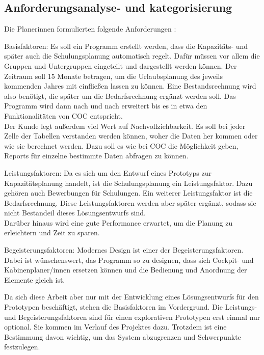 \documentclass [12pt, a4paper, oneside, titlepage, ngerman]{article}
\begin{document}
\subsection{Anforderungsanalyse- und kategorisierung}
Die Planerinnen formulierten folgende Anforderungen \cite[vgl.]{Gespraech2}:
\begin{description}
\item Basisfaktoren: Es soll ein Programm erstellt werden, dass die Kapazitäts- und später auch die Schulungsplanung automatisch regelt. Dafür müssen vor allem die Gruppen und Untergruppen eingeteilt und dargestellt werden können. Der Zeitraum soll 15 Monate betragen, um die Urlaubsplanung des jeweils kommenden Jahres mit einfließen lassen zu können. Eine Bestandsrechnung wird also benötigt, die später um die Bedarfsrechnung ergänzt werden soll. Das Programm wird dann nach und nach erweitert bis es in etwa den Funktionalitäten von \ac{COC} entspricht. \\
Der Kunde legt außerdem viel Wert auf Nachvollziehbarkeit. Es soll bei jeder Zelle der Tabellen verstanden werden können, woher die Daten her kommen oder wie sie berechnet werden. Dazu soll es wie bei \ac{COC} die Möglichkeit geben, Reports für einzelne bestimmte Daten abfragen zu können. %
\item Leistungsfaktoren: Da es sich um den Entwurf eines Prototyps zur Kapazitätsplanung handelt, ist die Schulungsplanung ein Leistungsfaktor. Dazu gehören auch Bewerbungen für Schulungen. Ein weiterer Leistungsfaktor ist die Bedarfsrechnung. Diese Leistungsfaktoren werden aber später ergänzt, sodass sie nicht Bestandeil dieses Lösungsentwurfs sind. \\
Darüber hinaus wird eine gute Performance erwartet, um die Planung zu erleichtern und Zeit zu sparen.
\item Begeisterungsfaktoren: Modernes Design ist einer der Begeisterungsfaktoren. Dabei ist wünschenswert, das Programm so zu designen, dass sich Cockpit- und Kabinenplaner/innen ersetzen können und die Bedienung und Anordnung der Elemente gleich ist. 
\end{description}
Da sich diese Arbeit aber nur mit der Entwicklung eines Lösungsentwurfs für den Prototypen beschäftigt, stehen die Basisfaktoren im Vordergrund. Die Leistungs- und Begeisterungsfaktoren sind für einen explorativen Prototypen erst einmal nur optional. Sie kommen im Verlauf des Projektes dazu. Trotzdem ist eine Bestimmung davon wichtig, um das System abzugrenzen und Schwerpunkte festzulegen.
\end{document}
